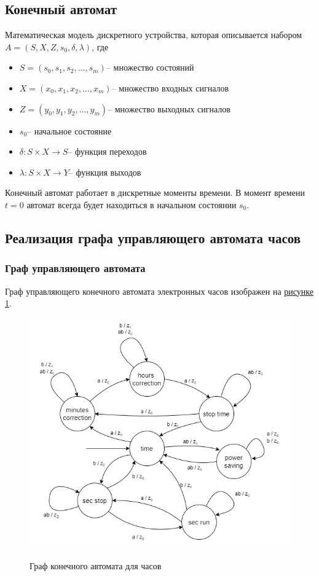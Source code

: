 \documentclass[10pt,a4paper,final]{article} %
\begin{document}
\subsection{Конечный автомат}
Математическая модель дискретного устройства, которая описывается набором $A = (S, X, Z, s_0, \delta, \lambda)$, где 
\begin{itemize}
	\item $S = (s_0, s_1, s_2, ... , s_m) \text{-- множество состояний}$
	\item $X = (x_0, x_1, x_2, ... , x_m) \text{-- множество входных сигналов}$
	\item $Z = (y_0, y_1, y_2, ... , y_m) \text{-- множество выходных сигналов}$
	\item $s_0 \text{-- начальное состояние} $
	\item $\delta: S \times X \rightarrow S \text{-- функция переходов}$
	\item  $\lambda: S \times X \rightarrow Y \text{-- функция выходов}$
\end{itemize}

Конечный автомат работает в дискретные моменты времени. В момент времени $t=0$ автомат всегда будет находиться в начальном состоянии $s_0$.

\subsection{Реализация графа управляющего автомата часов}
\subsubsection{Граф управляющего автомата}
Граф управляющего конечного автомата электронных часов изображен на  \hyperref[КА]{рисунке 1}.
\newpage
\begin{figure}[htpb]
	\centering
	\includegraphics[scale=0.6]{img/state machine.png}
	\label{КА} 
	\caption{Граф конечного автомата для часов}
\end{figure}
\end{document}
